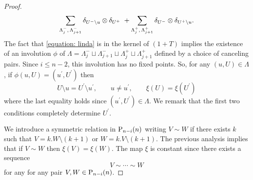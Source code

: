 \begin{proof}
    \begin{equation} \label{equation: linda}
    \sum_{\Lambda_j^-,\, \Lambda_{j+1}^-} \delta_{U^- \setminus u} \ot \delta_{U^+} \ +
    \sum_{\Lambda_j^+,\, \Lambda_{j+1}^+} \delta_{U^-} \ot \delta_{U^+ \setminus u}.
    \end{equation}
    The fact that \eqref{equation: linda} is in the kernel of $(1+T)$ implies the existence of an involution $\phi$ of $\Lambda = \Lambda^-_{j} \sqcup \Lambda^-_{j+1} \sqcup \Lambda^+_{j} \sqcup \Lambda^+_{j+1}$ defined by a choice of canceling pairs. Since $i \leq n-2$, this involution has no fixed points. So, for any $(u, U) \in \Lambda$, if $\phi(u, U) = (u^\prime, U^\prime)$ then
    \[
    U \setminus u = U^\prime \setminus u^\prime, \qquad u \neq u^\prime, \qquad \xi(U) = \xi(U^\prime)
    \]
    where the last equality holds since $(u^\prime, U^\prime) \in \Lambda$. We remark that the first two conditions completely determine $U^\prime$.

    We introduce a symmetric relation in $\P_{n-i}(n)$ writing $V \sim W$ if there exists $k$ such that $V = k.W \setminus(k+1)$ or $W = k.V \setminus(k+1)$. The previous analysis implies that if $V \sim W$ then $\xi(V) = \xi(W)$. The map $\xi$ is constant since there exists a sequence
    \[
    V \sim \cdots \sim W
    \]
    for any for any pair $V, W \in \P_{n-i}(n)$.
\end{proof}

%
%
%
%
%

